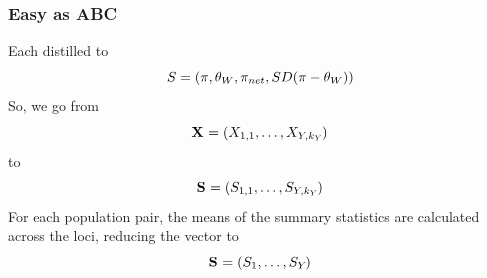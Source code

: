 \begin{frame}
    \frametitle{Easy as ABC}
        Each \alignment{}{} distilled to
        \[
            \alignmentSS{}{} = (\pi, \theta_W, \pi_{net}, SD(\pi-\theta_W) )
        \]
        So, we go from
        \[
            \alignmentVector = (\alignment{1}{1}, \ldots,
            \alignment{\npairs{}}{\nloci{\npairs{}}})
        \]
        to
        \[
            \ssVector{} = (\alignmentSS{1}{1}, \ldots,
            \alignmentSS{\npairs{}}{\nloci{\npairs{}}})
        \]
        For each population pair, the means of the summary statistics are
        calculated across the \nloci{} loci, reducing the vector to
        \[
            \ssVector{} = (\alignmentSS{1}{}, \ldots,
            \alignmentSS{\npairs{}}{})
        \]
\end{frame}

